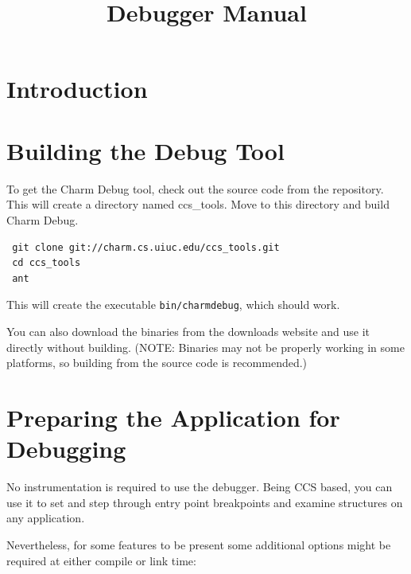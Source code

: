 \documentclass[10pt]{article}
\title{\charmpp\\ Debugger Manual}
\begin{document}
\maketitle

\section{Introduction}
\label{sec:intro}



\section{Building the \charmpp{} Debug Tool}

To get the Charm Debug tool, check out the source code from the repository.
This will create a directory named ccs\_tools. Move to this directory and 
build Charm Debug.

\begin{verbatim}
 git clone git://charm.cs.uiuc.edu/ccs_tools.git 
 cd ccs_tools
 ant
\end{verbatim}

This will create the executable {\tt bin/charmdebug}, which should work.

You can also download the binaries from the \charmpp{} downloads website and use it
directly without building.
(NOTE: Binaries may not be properly working in some platforms, so building from the
source code is recommended.)


\section{Preparing the \charmpp Application for Debugging}

No instrumentation is required to use the \charmpp{} debugger.  Being
CCS based, you can use it to set and step through entry point
breakpoints and examine \charmpp{} structures on any \charmpp{}
application.

Nevertheless, for some features to be present some additional options might
be required at either compile or link time:
\end{document}
